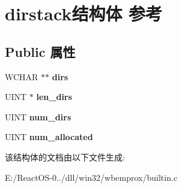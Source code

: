 \hypertarget{structdirstack}{}\section{dirstack结构体 参考}
\label{structdirstack}
\subsection*{Public 属性}
\begin{DoxyCompactItemize}
\item 
\mbox{\label{structdirstack_affcdf1d599831bbce983d2f711c14bc5}} 
W\+C\+H\+AR $\ast$$\ast$ {\bfseries dirs}
\item 
\mbox{\label{structdirstack_a7705257556927da0e7aa663f28688139}} 
U\+I\+NT $\ast$ {\bfseries len\+\_\+dirs}
\item 
\mbox{\label{structdirstack_aa4163df18412edd6061129476cc14fca}} 
U\+I\+NT {\bfseries num\+\_\+dirs}
\item 
\mbox{\label{structdirstack_a0a27809c7f2bedec21a436f6388842ea}} 
U\+I\+NT {\bfseries num\+\_\+allocated}
\end{DoxyCompactItemize}


该结构体的文档由以下文件生成\+:\begin{DoxyCompactItemize}
\item 
E\+:/\+React\+O\+S-\/0../dll/win32/wbemprox/builtin.\+c\end{DoxyCompactItemize}
